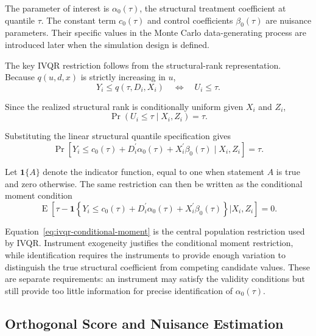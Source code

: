 The parameter of interest is \(\alpha_0(\tau)\), the structural treatment coefficient at quantile \(\tau\). The constant term \(c_0(\tau)\) and control coefficients \(\beta_0(\tau)\) are nuisance parameters. Their specific values in the Monte Carlo data-generating process are introduced later when the simulation design is defined.

The key IVQR restriction follows from the structural-rank representation. Because \(q(u,d,x)\) is strictly increasing in \(u\),
\[
    Y_i\leq q(\tau,D_i,X_i)
    \quad\Longleftrightarrow\quad
    U_i\leq\tau.
\]

Since the realized structural rank is conditionally uniform given \(X_i\) and \(Z_i\),
\[
    \Pr(U_i\leq\tau\mid X_i,Z_i)=\tau.
\]

Substituting the linear structural quantile specification gives
\begin{equation}
    \Pr\!\left[
        Y_i \leq c_0(\tau)
        + D_i^{\prime}\alpha_0(\tau)
        + X_i^{\prime}\beta_0(\tau)
        \mid X_i,Z_i
    \right]
    = \tau.
    \label{eq:ivqr-conditional-restriction}
\end{equation}

Let \(\mathbf{1}\{A\}\) denote the indicator function, equal to one when statement \(A\) is true and zero otherwise. The same restriction can then be written as the conditional moment condition
\begin{equation}
    \operatorname{E}\!\left[
        \tau
        - \mathbf{1}\!\left\{
            Y_i \leq c_0(\tau)
            + D_i^{\prime}\alpha_0(\tau)
            + X_i^{\prime}\beta_0(\tau)
        \right\}
        \mathrel{\big|} X_i,Z_i
    \right]
    = 0.
    \label{eq:ivqr-conditional-moment}
\end{equation}

Equation~\eqref{eq:ivqr-conditional-moment} is the central population restriction used by IVQR. Instrument exogeneity justifies the conditional moment restriction, while identification requires the instruments to provide enough variation to distinguish the true structural coefficient from competing candidate values. These are separate requirements: an instrument may satisfy the validity conditions but still provide too little information for precise identification of \(\alpha_0(\tau)\).

\subsection{Orthogonal Score and Nuisance Estimation}

